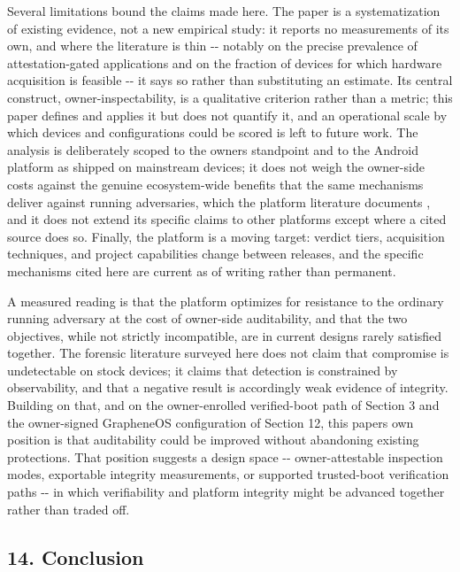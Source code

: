 \documentclass[
]{article}
\begin{document}
Several limitations bound the claims made here. The paper is a
systematization of existing evidence, not a new empirical study: it
reports no measurements of its own, and where the literature is thin
-\/- notably on the precise prevalence of attestation-gated applications
and on the fraction of devices for which hardware acquisition is
feasible -\/- it says so rather than substituting an estimate. Its
central construct, owner-inspectability, is a qualitative criterion
rather than a metric; this paper defines and applies it but does not
quantify it, and an operational scale by which devices and
configurations could be scored is left to future work. The analysis is
deliberately scoped to the owner\textquotesingle s standpoint and to the
Android platform as shipped on mainstream devices; it does not weigh the
owner-side costs against the genuine ecosystem-wide benefits that the
same mechanisms deliver against running adversaries, which the platform
literature documents \citep{mayrhofer-android-security-model}, and it
does not extend its specific claims to other platforms except where a
cited source does so. Finally, the platform is a moving target: verdict
tiers, acquisition techniques, and project capabilities change between
releases, and the specific mechanisms cited here are current as of
writing rather than permanent.

A measured reading is that the platform optimizes for resistance to the
ordinary running adversary at the cost of owner-side auditability, and
that the two objectives, while not strictly incompatible, are in current
designs rarely satisfied together. The forensic literature surveyed here
does not claim that compromise is undetectable on stock devices; it
claims that detection is constrained by observability, and that a
negative result is accordingly weak evidence of integrity. Building on
that, and on the owner-enrolled verified-boot path of Section 3 and the
owner-signed GrapheneOS configuration of Section 12, this
paper\textquotesingle s own position is that auditability could be
improved without abandoning existing protections. That position suggests
a design space -\/- owner-attestable inspection modes, exportable
integrity measurements, or supported trusted-boot verification paths
-\/- in which verifiability and platform integrity might be advanced
together rather than traded off.

\subsection{14. Conclusion}\label{conclusion}
\end{document}

